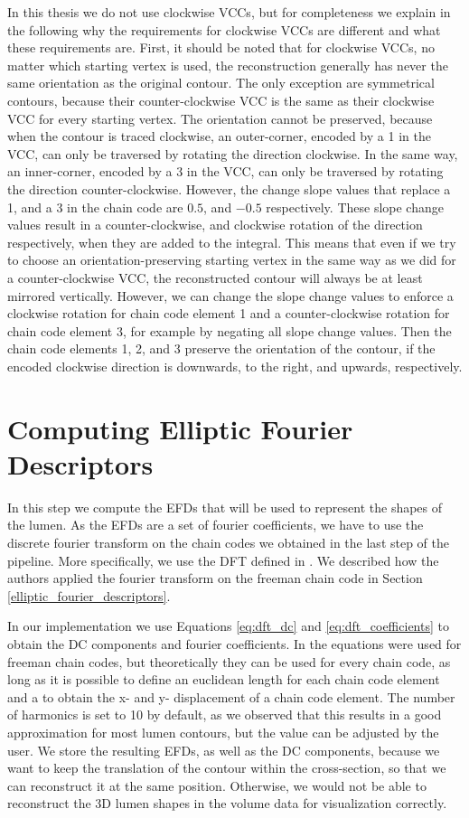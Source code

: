 \documentclass[thesis.tex]{subfiles}
\begin{document}
In this thesis we do not use clockwise VCCs, but for completeness we explain in the following why the requirements for clockwise VCCs are different and what these requirements are. First, it should be noted that for clockwise VCCs, no matter which starting vertex is used, the reconstruction generally has never the same orientation as the original contour. The only exception are symmetrical contours, because their counter-clockwise VCC is the same as their clockwise VCC for every starting vertex. The orientation cannot be preserved, because when the contour is traced clockwise, an outer-corner, encoded by a 1 in the VCC, can only be traversed by rotating the direction clockwise. In the same way, an inner-corner, encoded by a 3 in the VCC, can only be traversed by rotating the direction counter-clockwise. However, the change slope values that replace a 1, and a 3 in the chain code are $0.5$, and $-0.5$ respectively. These slope change values result in a counter-clockwise, and clockwise rotation of the direction respectively, when they are added to the integral. This means that even if we try to choose an orientation-preserving starting vertex in the same way as we did for a counter-clockwise VCC, the reconstructed contour will always be at least mirrored vertically. However, we can change the slope change values to enforce a clockwise rotation for chain code element 1 and a counter-clockwise rotation for chain code element 3, for example by negating all slope change values. Then the chain code elements 1, 2, and 3 preserve the orientation of the contour, if the encoded clockwise direction is downwards, to the right, and upwards, respectively.    
 


\section{Computing Elliptic Fourier Descriptors}
In this step we compute the EFDs that will be used to represent the shapes of the lumen. As the EFDs are a set of fourier coefficients, we have to use the discrete fourier transform on the chain codes we obtained in the last step of the pipeline. More specifically, we use the DFT defined in \cite{giardinia}. We described how the authors applied the fourier transform on the freeman chain code in Section \ref{elliptic_fourier_descriptors}. 

In our implementation we use Equations \ref{eq:dft_dc} and \ref{eq:dft_coefficients} to obtain the DC components and fourier coefficients. In \cite{giardinia} the equations were used for freeman chain codes, but theoretically they can be used for every chain code, as long as it is possible to define an euclidean length for each chain code element and a to obtain the x- and y- displacement of a chain code element. The number of harmonics is set to 10 by default, as we observed that this results in a good approximation for most lumen contours, but the value can be adjusted by the user. We store the resulting EFDs, as well as the DC components, because we want to keep the translation of the contour within the cross-section, so that we can reconstruct it at the same position. Otherwise, we would not be able to reconstruct the 3D lumen shapes in the volume data for visualization correctly.
\end{document}
